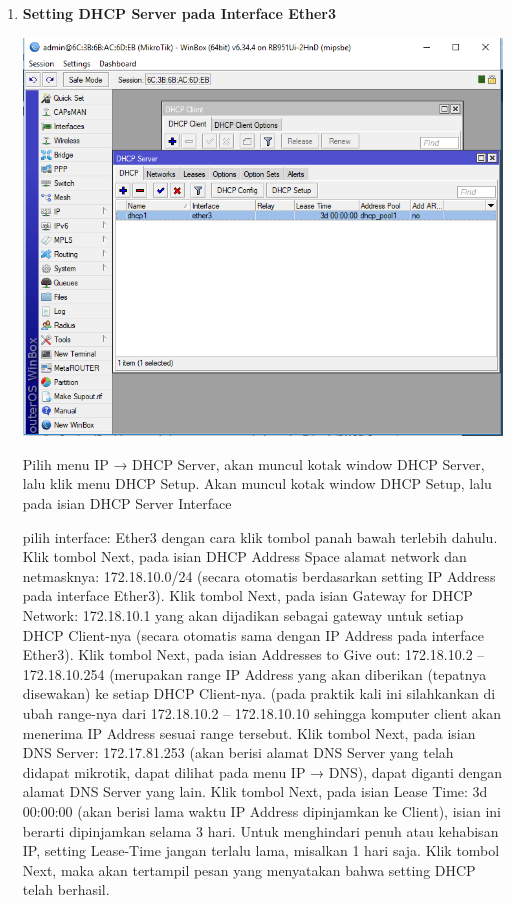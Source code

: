 \documentclass[a4paper,12pt]{article}
\begin{document}
\begin{enumerate}
	\item \textbf{Setting DHCP Server pada Interface Ether3}\\
	\begin{center}
		\includegraphics[scale=.5]{Capture10}
	\end{center}
	Pilih menu IP → DHCP Server, akan muncul kotak window DHCP Server, lalu klik menu DHCP Setup.
	Akan muncul kotak window DHCP Setup, lalu pada isian DHCP Server Interface
	
	pilih interface: Ether3 dengan cara klik tombol panah bawah terlebih dahulu. Klik tombol Next, pada isian DHCP Address Space alamat network dan netmasknya: 172.18.10.0/24 (secara otomatis berdasarkan setting IP Address pada interface Ether3).
	Klik tombol Next, pada isian Gateway for DHCP Network: 172.18.10.1 yang akan dijadikan sebagai gateway untuk setiap DHCP Client-nya (secara otomatis sama dengan IP Address pada interface Ether3).
	Klik tombol Next, pada isian Addresses to Give out: 172.18.10.2 – 172.18.10.254 (merupakan range IP Address yang akan diberikan (tepatnya disewakan) ke setiap DHCP Client-nya. (pada praktik kali ini silahkankan di ubah range-nya dari 172.18.10.2 – 172.18.10.10 sehingga komputer client akan menerima IP Address sesuai range tersebut.
	Klik tombol Next, pada isian DNS Server: 172.17.81.253 (akan berisi alamat DNS Server yang telah didapat mikrotik, dapat dilihat pada menu IP → DNS), dapat diganti dengan alamat DNS Server yang lain.
	Klik tombol Next, pada isian Lease Time: 3d 00:00:00 (akan berisi lama waktu IP Address dipinjamkan ke Client), isian ini berarti dipinjamkan selama 3 hari. Untuk menghindari penuh atau kehabisan IP, setting Lease-Time jangan terlalu lama, misalkan 1 hari saja.
	Klik tombol Next, maka akan tertampil pesan yang menyatakan bahwa setting DHCP telah berhasil.
	

\end{enumerate}
\end{document}
